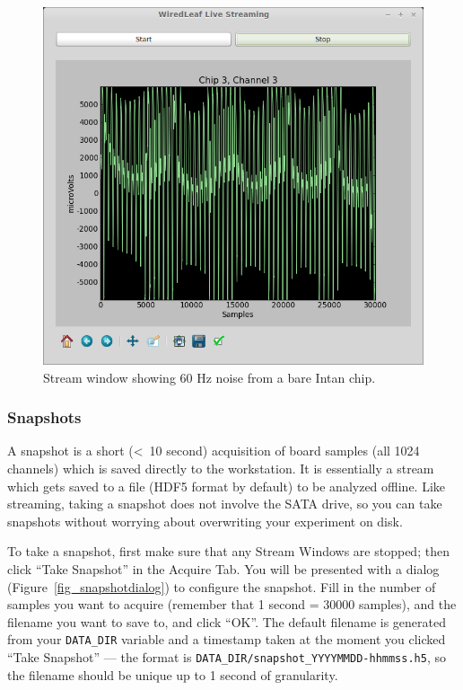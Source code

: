 \begin{figure}[h!]
\begin{center}
\includegraphics[width=12cm]{screenshots/streamwindow.png}
\end{center}
\caption{Stream window showing 60 Hz noise from a bare Intan chip.}
\label{fig_streamwindow}
\end{figure}

\subsubsection{Snapshots}
\label{sec_usage_acquire_snapshot}

A snapshot is a short (\textless~10 second) acquisition of board samples (all 1024 channels) which is saved directly to the workstation. It is essentially a stream which gets saved to a file (HDF5 format by default) to be analyzed offline. Like streaming, taking a snapshot does not involve the SATA drive, so you can take snapshots without worrying about overwriting your experiment on disk.

To take a snapshot, first make sure that any Stream Windows are stopped; then click ``Take Snapshot'' in the Acquire Tab. You will be presented with a dialog (Figure~\ref{fig_snapshotdialog}) to configure the snapshot. Fill in the number of samples you want to acquire (remember that 1 second = 30000 samples), and the filename you want to save to, and click ``OK''. The default filename is generated from your \texttt{DATA\_DIR} variable and a timestamp taken at the moment you clicked ``Take Snapshot'' --- the format is \texttt{DATA\_DIR/snapshot\_YYYYMMDD-hhmmss.h5}, so the filename should be unique up to 1 second of granularity.


